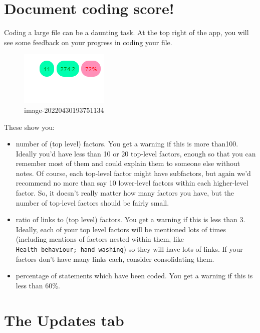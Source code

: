 \documentclass[
]{book}
\providecommand{\tightlist}{%
  \setlength{\itemsep}{0pt}\setlength{\parskip}{0pt}}
\begin{document}
\hypertarget{xgamification}{%
\chapter{Document coding score!}\label{xgamification}}

Coding a large file can be a daunting task. At the top right of the app, you will see some feedback on your progress in coding your file.

\begin{figure}
\centering
\includegraphics{_assets/image-20220430193751134.png}
\caption{image-20220430193751134}
\end{figure}

These show you:

\begin{itemize}
\tightlist
\item
  number of (top level) factors. You get a warning if this is more than100. Ideally you'd have less than 10 or 20 top-level factors, enough so that you can remember most of them and could explain them to someone else without notes. Of course, each top-level factor might have subfactors, but again we'd recommend no more than say 10 lower-level factors within each higher-level factor. So, it doesn't really matter how many factors you have, but the number of top-level factors should be fairly small.
\item
  ratio of links to (top level) factors. You get a warning if this is less than 3. Ideally, each of your top level factors will be mentioned lots of times (including mentions of factors nested within them, like \texttt{Health\ behaviour;\ hand\ washing}) so they will have lots of links. If your factors don't have many links each, consider consolidating them.
\item
  percentage of statements which have been coded. You get a warning if this is less than 60\%.
\end{itemize}

\hypertarget{xupdates-tab}{%
\chapter{The Updates tab}\label{xupdates-tab}}
\end{document}
